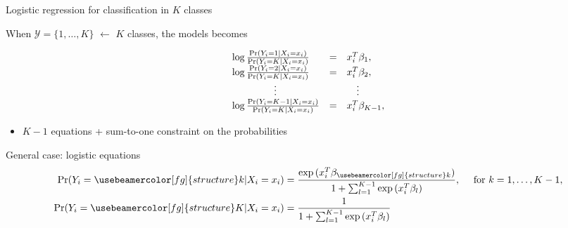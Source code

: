\documentclass[compress, smaller, serif, 9pt]{beamer}
\newcommand{\structuretext}[1]{{\usebeamercolor[fg]{structure} #1}}
\newcommand{\doigt}{\structuretext{\noindent \Pisymbol{pzd}{43}}}
\begin{document}
\begin{frame}{Logistic regression for classification in $K$ classes}
 
 When $\mathcal{Y}=\{1,\ldots,K\}$ $\leftarrow$ $K$ classes,  the models becomes
 
$$
 \begin{array}{lcl}
 \log \frac{\Pr(Y_i=1 | X_i=x_i)}{\Pr(Y_i=K | X_i=x_i)} &=& x_i^T \beta_1,\\
 \log \frac{\Pr(Y_i=2 | X_i=x_i)}{\Pr(Y_i=K | X_i=x_i)} &=& x_i^T \beta_2,\\
 \hspace{15mm} \vdots & & \quad \vdots\\
 \log \frac{\Pr(Y_i=K-1 | X_i=x_i)}{\Pr(Y_i=K | X_i=x_i)} &=& x_i^T \beta_{K-1},
 \end{array}$$
\begin{itemize}
 \item[\doigt] $K-1$ equations +  sum-to-one constraint on the probabilities
\end{itemize}

\medskip
\begin{block}{General case: logistic equations}
\vspace{-3mm}
\begin{align*}
\Pr(Y_i=\structuretext{k} | X_i=x_i) &=  \frac{\exp{(x_i^T \beta_\structuretext{k})}}{1+ \sum_{l=1}^{K-1} \exp{(x_i^T \beta_l)}}, \quad \textrm{ for } k=1,\ldots,K-1,\\
 \Pr(Y_i=\structuretext{K} | X_i=x_i) &=  \frac{1}{1+\sum_{l=1}^{K-1} \exp{(x_i^T \beta_l)}}
  \end{align*}
\end{block}


\end{frame}
\end{document}
